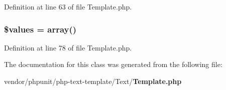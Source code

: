 Definition at line 63 of file Template.\+php.

\subsubsection[{\$values}]{\setlength{\rightskip}{0pt plus 5cm}\${\bf values} = array()\hspace{0.3cm}{\ttfamily [protected]}}\label{class_text___template_affc45c6ace2eeb3f300b054dbf9592b6}


Definition at line 78 of file Template.\+php.



The documentation for this class was generated from the following file\+:\begin{DoxyCompactItemize}
\item 
vendor/phpunit/php-\/text-\/template/\+Text/{\bf Template.\+php}\end{DoxyCompactItemize}
